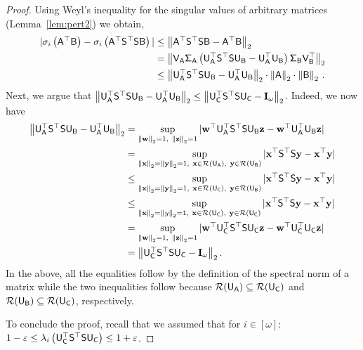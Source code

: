 \begin{proof}
Using Weyl's inequality for the singular values of arbitrary matrices (Lemma~\ref{lem:pert2}) we obtain,
%
\begin{align*}
	| \sigma_i \left( \matA^\top\matB  \right)   - \sigma_i\left( \matA^\top \matS ^\top \matS \matB \right)|%
	 & \leq  \norm{  \matA^\top \matS ^\top \matS \matB - \matA^\top\matB }\\
     &  =    \norm{  \matV_{\matA}\matSig_{\matA}\left(\matU_{\matA}^\top \matS ^\top \matS \matU_{\matB}  - \matU_{\matA}^\top\matU_{\matB} \right)\matSig_{\matB} \matV^\top_{\matB} } \\
     & \leq  \norm{  \matU_{\matA}^\top \matS^\top \matS \matU_{\matB} - \matU_{\matA}^\top \matU_{\matB} } \cdot\norm{\matA}\cdot\norm{\matB}\,.
\end{align*}
%
Next, we argue that $ \left\|  {\mathsf{U} }_{{\mathsf{A} }}^\top {\ensuremath{\mathsf{S} }}^\top {\ensuremath{\mathsf{S} }} {\ensuremath{\mathsf{U} }}_{{\mathsf{B} }} - {\mathsf{U} }_{{\mathsf{A} }}^\top {\ensuremath{\mathsf{U} }}_{{\mathsf{B} }} \right\|_2 \le \left\|{\mathsf{U} }_{{\mathsf{C} }}^\top {\ensuremath{\mathsf{S} }}^\top {\ensuremath{\mathsf{S} }} {\ensuremath{\mathsf{U} }}_{{\mathsf{C} }}   - \mathbf{I}_{\omega}\right\|_2$.
Indeed, we now have
\begin{align*}
	\norm{  \matU_{\matA}^\top \matS^\top \matS \matU_{\matB} - \matU_{\matA}^\top \matU_{\matB} } %
	& =  \sup_{\norm{\w}=1,\ \norm{\z}=1} | \w^\top \matU_{\matA}^\top \matS^\top \matS \matU_{\matB} \z - \w^\top \matU_{\matA}^\top \matU_{\matB}\z | \\
	& =  \sup_{\norm{\x}=\norm{\y} = 1,\ \x\in{\mathcal{R}(\matU_{\matA})},\ \y\in{\mathcal{R} (\matU_{\matB})} } | \x^\top \matS^\top \matS \y - \x^\top \y | \\
	& \leq  \sup_{\norm{\x}=\norm{\y} = 1,\ \x\in{\mathcal{R}(\matU_{\matC})},\ \y\in{\mathcal{R}(\matU_{\matB}) }} | \x^\top \matS^\top \matS \y - \x^\top \y | \\
	& \leq  \sup_{\norm{\x}=\norm{y} = 1,\ \x\in{\mathcal{R}(\matU_{\matC})},\ \y\in{\mathcal{R}(\matU_{\matC})}} | \x^\top \matS^\top \matS \y - \x^\top \y | \\
	&   =   \sup_{\norm{\w}=1,\ \norm{\z}=1} | \w^\top \matU_{\matC}^\top \matS^\top \matS \matU_{\matC} \z  - \w^\top\matU_{\matC}^\top \matU_{\matC} \z | \\
	&   =   \norm{\matU_{\matC}^\top \matS^\top \matS \matU_{\matC}   - \matI_{\omega}}.
\end{align*}
In the above, all the equalities follow by the definition of the spectral norm of a matrix while the two inequalities follow
because $\mathcal{R}({\mathsf{U} }_{{\mathsf{A} }}) \subseteq \mathcal{R}({\mathsf{U} }_{{\mathsf{C} }})$ and $\mathcal{R}({\mathsf{U} }_{{\mathsf{B} }}) \subseteq \mathcal{R}({\mathsf{U} }_{{\mathsf{C} }})$, respectively.

To conclude the proof, recall that we assumed that for $i \in [\omega]$:
$1-\varepsilon \le \lambda_i \left( {\mathsf{U} }_{{\mathsf{C} }}^\top {\ensuremath{\mathsf{S} }}^\top {\ensuremath{\mathsf{S} }} {\ensuremath{\mathsf{U} }}_{{\mathsf{C} }} \right) \le 1+\varepsilon$.
\end{proof}

